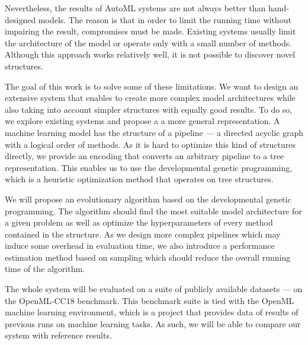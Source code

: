 Nevertheless, the results of AutoML systems are not always better
than hand-designed models. The reason is that in order to limit the running time
without impairing the result, compromises must be made. Existing systems
usually limit the architecture of the model or operate only with a small number
of methods. Although this approach works relatively well, it is not possible to
discover novel structures.

The goal of this work is to solve some of these limitations. We want to design
an extensive system that enables to create more complex model architectures
while also taking into account simpler structures with equally good results.
To do so, we explore existing systems and propose a a more general
representation. A machine learning model has the structure of a pipeline ---
a directed acyclic graph with a logical order of methods. As it is hard to
optimize this kind of structures directly, we provide an encoding that converts
an arbitrary pipeline to a tree representation. This enables us to use the
developmental genetic programming, which is a heuristic optimization method
that operates on tree structures.

We will propose an evolutionary algorithm based on the developmental genetic
programming. The algorithm should find the most suitable model architecture
for a given problem as well as optimize the hyperparameters of every method
contained in the structure. As we design more complex pipelines which may
induce some overhead in evaluation time, we also introduce a performance
estimation method based on sampling which should reduce the overall running
time of the algorithm.

The whole system will be evaluated on a suite of publicly available datasets
--- on the OpenML-CC18 benchmark. This benchmark suite is tied with the OpenML
machine learning environment, which is a project that provides data of
results of previous runs on machine learning tasks. As such, we will be able
to compare our system with reference results.


